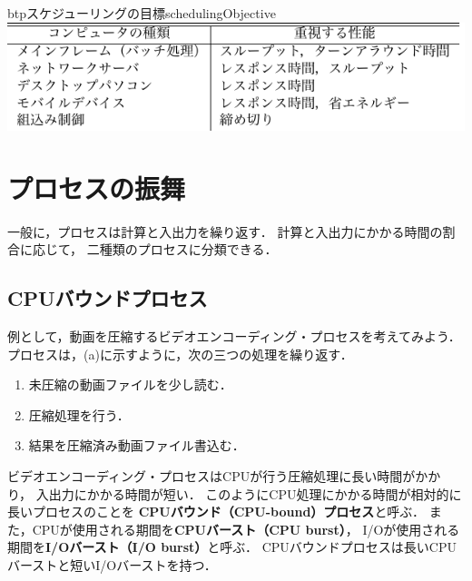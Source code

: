 \begin{mytable}{btp}{スケジューリングの目標}{schedulingObjective}
  \includegraphics[scale=1.0]{Tbl/schedulingObjective.pdf}
\end{mytable}

\section{プロセスの振舞}
一般に，プロセスは計算と入出力を繰り返す．
計算と入出力にかかる時間の割合に応じて，
二種類のプロセスに分類できる．

\subsection{CPUバウンドプロセス}
例として，動画を圧縮するビデオエンコーディング・プロセスを考えてみよう．
プロセスは，(a)に示すように，次の三つの処理を繰り返す．

\begin{enumerate}
\item 未圧縮の動画ファイルを少し読む．
\item 圧縮処理を行う．
\item 結果を圧縮済み動画ファイル書込む．
\end{enumerate}

ビデオエンコーディング・プロセスはCPUが行う圧縮処理に長い時間がかかり，
入出力にかかる時間が短い．
このようにCPU処理にかかる時間が相対的に長いプロセスのことを
{\bf CPUバウンド（CPU-bound）プロセス}と呼ぶ．
また，CPUが使用される期間を{\bf CPUバースト（CPU burst）}，
I/Oが使用される期間を{\bf I/Oバースト（I/O burst）}と呼ぶ．
CPUバウンドプロセスは長いCPUバーストと短いI/Oバーストを持つ．

